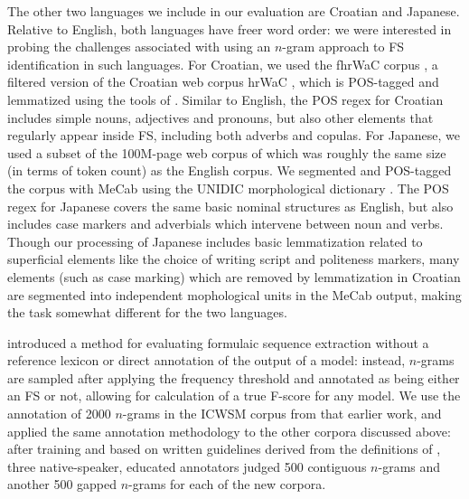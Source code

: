 \documentclass[11pt,letterpaper]{article}
\begin{document}
The other two languages we include in our evaluation are Croatian and Japanese. Relative to English, both languages have freer word order: we were interested in probing the challenges associated with using an $n$-gram approach to FS identification in such languages. For Croatian, we used the fhrWaC corpus \cite{snajder2013building}, a filtered version of the Croatian web corpus hrWaC \cite{ljubesic2014bs}, which is POS-tagged and lemmatized using the tools of . Similar to English, the POS regex for Croatian includes simple nouns, adjectives and pronouns, but also other elements that regularly appear inside FS, including both adverbs and copulas. For Japanese, we used a subset of the 100M-page web corpus of  which was roughly the same size (in terms of token count) as the English corpus. We segmented and POS-tagged the corpus with MeCab \cite{Kudo:2008} using the UNIDIC morphological dictionary \cite{Den:2007}. The POS regex for Japanese covers the same basic nominal structures as English, but also includes case markers and adverbials which intervene between noun and verbs. Though our processing of Japanese includes basic lemmatization related to superficial elements like the choice of writing script and politeness markers, many elements (such as case marking) which are removed by lemmatization in Croatian are segmented into independent mophological units in the MeCab output, making the task somewhat different for the two languages.


 introduced a method for evaluating formulaic sequence extraction without a reference lexicon or direct annotation of the output of a model: instead, $n$-grams are sampled after applying the frequency threshold and annotated as being either an FS or not, allowing for calculation of a true F-score for any model. We use the annotation of 2000 $n$-grams in the ICWSM corpus from that earlier work, and applied the same annotation methodology to the other corpora discussed above: after training and based on written guidelines derived from the definitions of , three native-speaker, educated annotators judged 500 contiguous $n$-grams and another 500 gapped $n$-grams for each of the new corpora. 


\end{document}
